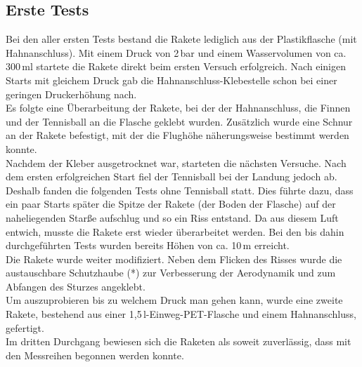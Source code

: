 \subsection{Erste Tests}
Bei den aller ersten Tests bestand die Rakete lediglich aus der Plastikflasche (mit Hahnanschluss). Mit einem Druck von 2\,bar und einem Wasservolumen von ca. 300\,ml startete die Rakete direkt beim ersten Versuch erfolgreich. Nach einigen Starts mit gleichem Druck gab die Hahnanschluss-Klebestelle schon bei einer geringen Druckerhöhung nach.\\
Es folgte eine Überarbeitung der Rakete, bei der der Hahnanschluss, die Finnen und der Tennisball an die Flasche geklebt wurden. Zusätzlich wurde eine Schnur an der Rakete befestigt, mit der die Flughöhe näherungsweise bestimmt werden konnte.\\ %
Nachdem der Kleber ausgetrocknet war, starteten die nächsten Versuche. Nach dem ersten erfolgreichen Start fiel der Tennisball bei der Landung jedoch ab. Deshalb fanden die folgenden Tests ohne Tennisball statt. Dies führte dazu, dass ein paar Starts später die Spitze der Rakete (der Boden der Flasche) auf der naheliegenden Starße aufschlug und so ein Riss entstand. Da aus diesem Luft entwich, musste die Rakete erst wieder überarbeitet werden. Bei den bis dahin durchgeführten Tests wurden bereits Höhen von ca. 10\,m erreicht.\\
Die Rakete wurde weiter modifiziert. Neben dem Flicken des Risses wurde die austauschbare Schutzhaube (*) zur Verbesserung der Aerodynamik und zum Abfangen des Sturzes angeklebt.\\ 
Um auszuprobieren bis zu welchem Druck man gehen kann, wurde eine zweite Rakete, bestehend aus einer 1,5\,l-Einweg-PET-Flasche und einem Hahnanschluss, gefertigt.\\
Im dritten Durchgang bewiesen sich die Raketen als soweit zuverlässig, dass mit den Messreihen begonnen werden konnte.


